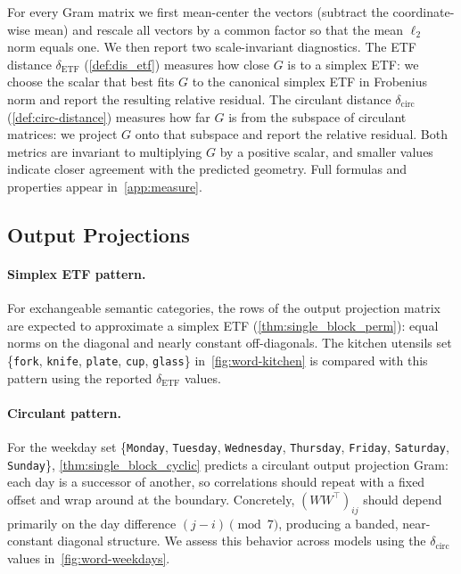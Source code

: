\documentclass[11pt]{article}
\begin{document}
For every Gram matrix we first mean-center the vectors (subtract the coordinate-wise mean) and rescale all vectors by a common factor so that the mean \(\ell_2\) norm equals one. We then report two scale-invariant diagnostics. The ETF distance \(\delta_{\mathrm{ETF}}\) (\cref{def:dis_etf}) measures how close \(G\) is to a simplex ETF: we choose the scalar that best fits \(G\) to the canonical simplex ETF in Frobenius norm and report the resulting relative residual. The circulant distance \(\delta_{\mathrm{circ}}\) (\cref{def:circ-distance}) measures how far \(G\) is from the subspace of circulant matrices: we project \(G\) onto that subspace and report the relative residual. Both metrics are invariant to multiplying \(G\) by a positive scalar, and smaller values indicate closer agreement with the predicted geometry. Full formulas and properties appear in~\cref{app:measure}.

\subsection{Output Projections}

\paragraph{Simplex ETF pattern.}
For exchangeable semantic categories, the rows of the output projection matrix are expected to approximate a simplex ETF (\cref{thm:single_block_perm}): equal norms on the diagonal and nearly constant off-diagonals. The kitchen utensils set \{\texttt{fork}, \texttt{knife}, \texttt{plate}, \texttt{cup}, \texttt{glass}\} in~\cref{fig:word-kitchen} is compared with this pattern using the reported \(\delta_{\mathrm{ETF}}\) values. 

\paragraph{Circulant pattern.}
For the weekday set \{\texttt{Monday}, \texttt{Tuesday}, \texttt{Wednesday}, \texttt{Thursday}, \texttt{Friday}, \texttt{Saturday}, \texttt{Sunday}\}, \cref{thm:single_block_cyclic} predicts a circulant output projection Gram: each day is a successor of another, so correlations should repeat with a fixed offset and wrap around at the boundary. Concretely, \(\left(WW^\top\right)_{ij}\) should depend primarily on the day difference \((j-i)\pmod{7}\), producing a banded, near-constant diagonal structure. We assess this behavior across models using the \(\delta_{\mathrm{circ}}\) values in~\cref{fig:word-weekdays}.
\end{document}

